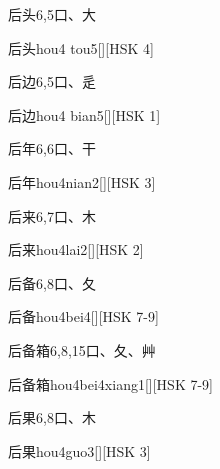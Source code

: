 \begin{Entry}{后头}{6,5}{⼝、⼤}
  \begin{Phonetics}{后头}{hou4 tou5}[][HSK 4]
  \end{Phonetics}
\end{Entry}

\begin{Entry}{后边}{6,5}{⼝、⾡}
  \begin{Phonetics}{后边}{hou4 bian5}[][HSK 1]
  \end{Phonetics}
\end{Entry}

\begin{Entry}{后年}{6,6}{⼝、⼲}
  \begin{Phonetics}{后年}{hou4nian2}[][HSK 3]
  \end{Phonetics}
\end{Entry}

\begin{Entry}{后来}{6,7}{⼝、⽊}
  \begin{Phonetics}{后来}{hou4lai2}[][HSK 2]
  \end{Phonetics}
\end{Entry}

\begin{Entry}{后备}{6,8}{⼝、⼡}
  \begin{Phonetics}{后备}{hou4bei4}[][HSK 7-9]
  \end{Phonetics}
\end{Entry}

\begin{Entry}{后备箱}{6,8,15}{⼝、⼡、⾋}
  \begin{Phonetics}{后备箱}{hou4bei4xiang1}[][HSK 7-9]
  \end{Phonetics}
\end{Entry}

\begin{Entry}{后果}{6,8}{⼝、⽊}
  \begin{Phonetics}{后果}{hou4guo3}[][HSK 3]
  \end{Phonetics}
\end{Entry}

